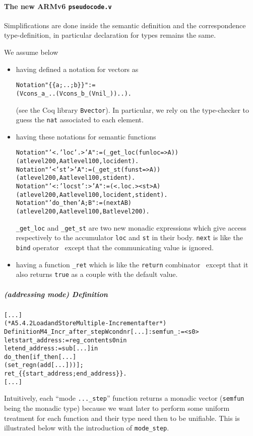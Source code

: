 \documentclass[a4paper, 11pt]{article}
\newenvironment{coq}
  {%
   \begin{alltt}
   \footnotesize} %% 8.3pl2 (April 2011)
  {\end{alltt} %
  }
\begin{document}
\paragraph{The new ARMv6 {\tt pseudocode.v}}
Simplifications are done inside the semantic definition and the correspondence type-definition, in particular declaration for types remains the same.

\hspace{1ex}

We assume below 
\begin{itemize}
\item having defined a notation for vectors as 
\begin{coq}
  Notation "\{\{ a ; .. ; b \}\}" := 
    (Vcons _ a _ .. (Vcons _ b _ (Vnil _)) ..).
\end{coq}
(see the Coq library \verb|Bvector|). In particular, we rely on the type-checker to guess the \verb|nat| associated to each element.
\item having these notations for semantic functions
\begin{coq}
Notation "'<.' loc '.>' A" := (_get_loc (fun loc => A)) 
  (at level 200, A at level 100, loc ident).
Notation "'<' st '>' A" := (_get_st (fun st => A)) 
  (at level 200, A at level 100, st ident).
Notation "'<:' loc st ':>' A" := (<.loc.> <st> A) 
  (at level 200, A at level 100, loc ident, st ident).
Notation "'do_then' A ; B" := (next A B)
  (at level 200 , A at level 100 , B at level 200).
\end{coq}
\verb|_get_loc| and \verb|_get_st| are two new monadic expressions which give access respectively to the accumulator \verb|loc| and \verb|st| in their body.
\verb|next| is like the \verb|bind| operator~\cite{peyton-jones-tackling-09} except that the communicating value is ignored.
\item having a function \verb|_ret| which is like the \verb|return| combinator~\cite{peyton-jones-tackling-09} except that it also returns \verb|true| as a couple with the default value.
\end{itemize}
  \subparagraph{(addressing mode) Definition}
\begin{coq}
[...]
(* A5.4.2 Load and Store Multiple - Increment after *)
Definition M4_Incr_after_step W cond n r [...] : semfun _ := <s0>
  let start_address := reg_content s0 n in
  let end_address := sub [...] in
  do_then [ if_then [...]
       (set_reg n (add [...])) ];
  ret_ \{\{ start_address ; end_address \}\}.
[...]
\end{coq}
Intuitively, each ``mode \verb|..._step|'' function returns a monadic vector (\verb|semfun| being the monadic type) because we want later to perform some uniform treatment for each function and their type need then to be unifiable. This is illustrated below with the introduction of \verb|mode_step|.
\end{document}
